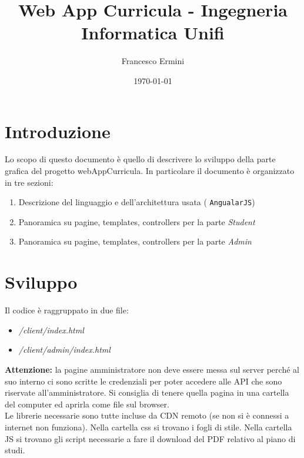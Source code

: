 \documentclass{article}
\title{Web App Curricula - Ingegneria Informatica Unifi} %
\author{Francesco Ermini}
\date{\today} %
\begin{document}
\maketitle

\newpage
\section{Introduzione}
Lo scopo di questo documento è quello di descrivere lo sviluppo della parte grafica del progetto webAppCurricula.
In particolare il documento è organizzato in tre sezioni:
\begin{enumerate}
\item Descrizione del linguaggio e dell'architettura usata ( \texttt{AngualarJS})
\item Panoramica su pagine, templates, controllers per la parte\emph{ Student}
\item Panoramica su pagine, templates, controllers per la parte \emph{Admin}
\end{enumerate}

\section{Sviluppo}
Il codice è raggruppato in due file:
\begin{itemize}
\item \emph{/client/index.html}
\item \emph{/client/admin/index.html}
\end{itemize}

\textbf{Attenzione:} la pagine amministratore non deve essere messa sul server perché al suo interno ci sono scritte le credenziali per poter accedere alle API che sono riservate all'amministratore. Si consiglia di tenere quella pagina in una cartella del computer ed aprirla come file sul browser.\\
Le librerie necessarie sono tutte incluse da CDN remoto (se non si è connessi a internet non funziona). Nella cartella css si trovano i fogli di stile. Nella cartella JS si trovano gli script necessarie a fare il download del PDF relativo al piano di studi.
\end{document}
